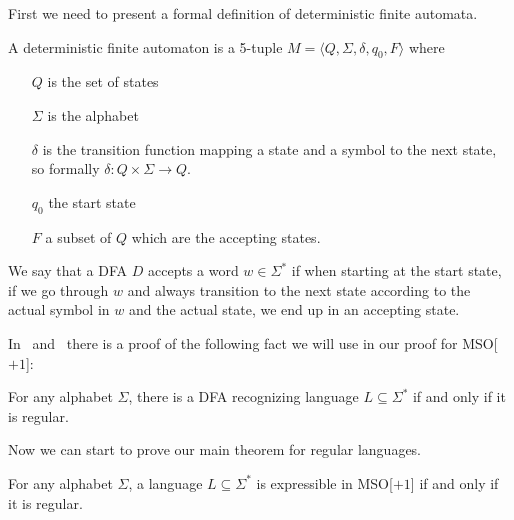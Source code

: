 First we need to present a formal definition of deterministic finite automata.
\begin{define}[DFA]
    A deterministic finite automaton is a 5-tuple $M = \langle Q, \Sigma, \delta, q_0,  F \rangle$ where
    \begin{itemize}
        \setlength\itemsep{0.15em}
        \item[$Q$] is the set of states
        \item[$\Sigma$] is the alphabet
        \item[$\delta$] is the transition function mapping a state and a symbol to the next state, so formally $\delta : Q\times \Sigma \to Q$.
        \item[$q_0$] the start state
        \item[$F$] a subset of $Q$ which are the accepting states.
    \end{itemize}
\end{define}
We say that a DFA $D$ accepts a word $w \in \Sigma^{*}$ if when starting at the start state, if we go through $w$ and always transition to the next state according to the actual symbol in $w$ and the actual state, we end up in an accepting state.

In~\cite{theory-cs} and~\cite{Straubing1994} there is a proof of the following fact we will use in our proof for \acs{MSO}[$+1$]:
\begin{theorem}
    For any alphabet $\Sigma$, there is a DFA recognizing language $L \subseteq \Sigma^{*}$ if and only if it is regular.
\end{theorem}

Now we can start to prove our main theorem for regular languages.
\begin{theorem}
    For any alphabet $\Sigma$, a language $L \subseteq \Sigma^{*}$ is expressible in \acs{MSO}[$+1$] if and only if it is regular.
\end{theorem}

